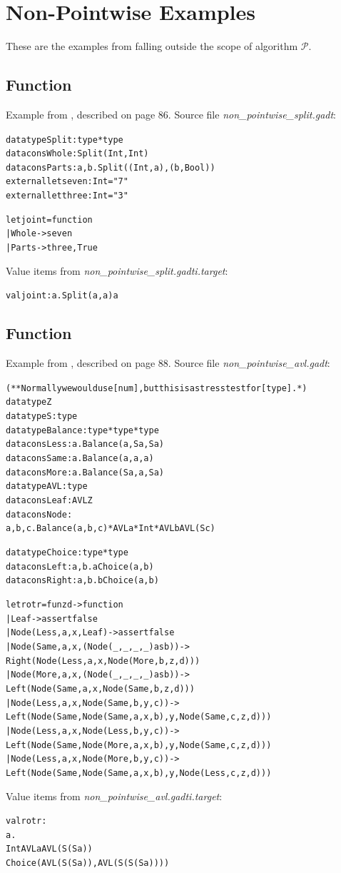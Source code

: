 \documentclass{article}
\newcommand{\tmem}[1]{{\em #1\/}}
\newcommand{\tmverbatim}[1]{{\ttfamily{#1}}}
\newenvironment{tmcode}[1][]{\begin{alltt}}{\end{alltt}}
\begin{document}
\section{Non-Pointwise Examples}

These are the examples from {\cite{PointwiseGADTs}} falling outside the scope
of algorithm $\mathcal{P}$.

\subsection{Function \tmverbatim{joint}}

Example from {\cite{PracticalGADTsInfer}}, described on page 86. Source file
{\tmem{non\_pointwise\_split.gadt}}:
\begin{tmcode}
datatype Split : type * type
datacons Whole : Split (Int, Int)
datacons Parts : a, b. Split ((Int, a), (b, Bool))
external let seven : Int = "7"
external let three : Int = "3"

let joint = function
  | Whole -> seven
  | Parts -> three, True
\end{tmcode}
Value items from {\tmem{non\_pointwise\_split.gadti.target}}:
\begin{tmcode}
val joint : a. Split (a, a)  a
\end{tmcode}

\subsection{Function \tmverbatim{rotr}}

Example from {\cite{PracticalGADTsInfer}}, described on page 88. Source file
{\tmem{non\_pointwise\_avl.gadt}}:
\begin{tmcode}
(** Normally we would use [num], but this is a stress test for [type]. *)
datatype Z
datatype S : type
datatype Balance : type * type * type
datacons Less : a. Balance (a, S a, S a)
datacons Same : a. Balance (a, a, a)
datacons More : a. Balance (S a, a, S a)
datatype AVL : type
datacons Leaf : AVL Z
datacons Node :
  a, b, c. Balance (a, b, c) * AVL a * Int * AVL b  AVL (S c)

datatype Choice : type * type
datacons Left : a, b. a  Choice (a, b)
datacons Right : a, b. b  Choice (a, b)

let rotr = fun z d -> function
  | Leaf -> assert false
  | Node (Less, a, x, Leaf) -> assert false
  | Node (Same, a, x, (Node (_,_,_,_) as b)) ->
    Right (Node (Less, a, x, Node (More, b, z, d)))
  | Node (More, a, x, (Node (_,_,_,_) as b)) ->
    Left (Node (Same, a, x, Node (Same, b, z, d)))
  | Node (Less, a, x, Node (Same, b, y, c)) ->
    Left (Node (Same, Node (Same, a, x, b), y, Node (Same, c, z, d)))
  | Node (Less, a, x, Node (Less, b, y, c)) ->
    Left (Node (Same, Node (More, a, x, b), y, Node (Same, c, z, d)))
  | Node (Less, a, x, Node (More, b, y, c)) ->
    Left (Node (Same, Node (Same, a, x, b), y, Node (Less, c, z, d)))
\end{tmcode}
Value items from {\tmem{non\_pointwise\_avl.gadti.target}}:
\begin{tmcode}
val rotr :
   a.
   Int  AVL a  AVL (S (S a)) 
     Choice (AVL (S (S a)), AVL (S (S (S a))))
\end{tmcode}
\end{document}
